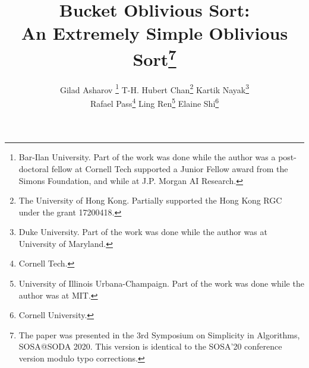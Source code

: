 \documentclass[11pt,letterpaper]{article}
\theoremstyle{boxes}
\begin{document}
\title{\bf Bucket Oblivious Sort: \\An Extremely Simple Oblivious Sort\thanks{The paper was presented in the 3rd Symposium on Simplicity in Algorithms, SOSA@SODA 2020. This version is identical
to the SOSA'20 conference version modulo typo corrections.
}}

\author{Gilad Asharov \thanks{Bar-Ilan University. Part of the work was done while the author was a post-doctoral fellow at Cornell Tech supported a Junior Fellow award from the Simons Foundation, and while at J.P. Morgan AI Research.} \qquad
T-H. Hubert Chan\thanks{The University of Hong Kong. Partially supported the Hong Kong RGC under the grant 17200418.} \qquad
Kartik Nayak\thanks{Duke University. Part of the work was done while the author was at University of Maryland.} \\
Rafael Pass\thanks{Cornell Tech.} \qquad
Ling Ren\thanks{University of Illinois Urbana-Champaign. Part of the work was done while the author was at MIT.} \qquad
Elaine Shi\thanks{Cornell University.}}

\newcommand{\rl}[1]{{\footnotesize\color{orange}[Ling: #1]}}

\date{}

\maketitle


\begin{abstract}

\end{abstract}








%


\appendix

%
\end{document}
